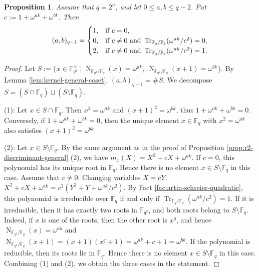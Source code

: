 \documentclass[10pt,a4paper]{article}
\newtheorem{prop}[thm]{Proposition}
\newcommand{\Tr}{\operatorname{Tr}}
\newcommand{\Norm}{\operatorname{N}}
\numberwithin{equation}{section}
\begin{document}
\begin{prop}\label{prop:r2-char2-general}
Assume that $q=2^n$, and let $0\le a,b\le q-2$. Put $c:=1+\omega^{ak}+\omega^{bk}$. Then
\[
(a,b)_{q-1}
=
\begin{cases}
1, & \textup{if } c=0,\\
0, & \textup{if } c\neq0 \textup{ and } \Tr_{\mathbb{F}_q/\mathbb{F}_2}(\omega^{ak}/c^2)=0,\\
2, & \textup{if } c\neq0 \textup{ and } \Tr_{\mathbb{F}_q/\mathbb{F}_2}(\omega^{ak}/c^2)=1.
\end{cases}
\]
\end{prop}

\begin{proof}
Let
$S:=\{x\in \mathbb{F}_{q^2}^\times\mid \Norm_{\mathbb{F}_{q^2}/\mathbb{F}_q}(x)=\omega^{ak},\ \Norm_{\mathbb{F}_{q^2}/\mathbb{F}_q}(x+1)=\omega^{bk}\}$. By Lemma \ref{lem:kernel-general-coset}, $(a,b)_{q-1}=\#S$. We decompose $S=(S\cap\mathbb{F}_q)\sqcup(S\setminus\mathbb{F}_q)$.

\noindent\textup{(1):} Let $x\in S\cap\mathbb{F}_q$. Then $x^2=\omega^{ak}$ and $(x+1)^2=\omega^{bk}$, thus $1+\omega^{ak}+\omega^{bk}=0$. Conversely, if $1+\omega^{ak}+\omega^{bk}=0$, then the unique element $x\in\mathbb{F}_q$ with $x^2=\omega^{ak}$ also satisfies $(x+1)^2=\omega^{bk}$. 

\noindent\textup{(2):} Let $x\in S\setminus\mathbb{F}_q$. By the same argument as in the proof of Proposition \ref{prop:r2-discriminant-general} \textup{(2)}, we have $m_{x}(X)=X^2+cX+\omega^{ak}$. If $c=0$, this polynomial has its unique root in $\mathbb{F}_q$. Hence there is no element $x\in S\setminus\mathbb{F}_q$ in this case. Assume that $c\neq0$. Changing variables $X=cY$, $X^2+cX+\omega^{ak}=c^2(Y^2+Y+\omega^{ak}/c^2)$. By Fact \ref{fac:artin-schreier-quadratic}, this polynomial is irreducible over $\mathbb{F}_q$ if and only if $\Tr_{\mathbb{F}_q/\mathbb{F}_2}(\omega^{ak}/c^2)=1$. If it is irreducible, then it has exactly two roots in $\mathbb{F}_{q^2}$, and both roots belong to $S\setminus\mathbb{F}_q$. Indeed, if $x$ is one of the roots, then the other root is $x^q$, and hence $\Norm_{\mathbb{F}_{q^2}/\mathbb{F}_q}(x)=\omega^{ak}$ and $\Norm_{\mathbb{F}_{q^2}/\mathbb{F}_q}(x+1)=(x+1)(x^q+1)=\omega^{ak}+c+1=\omega^{bk}$. If the polynomial is reducible, then its roots lie in $\mathbb{F}_q$. Hence there is no element $x\in S\setminus\mathbb{F}_q$ in this case. Combining \textup{(1)} and \textup{(2)}, we obtain the three cases in the statement.
\end{proof}
\end{document}
